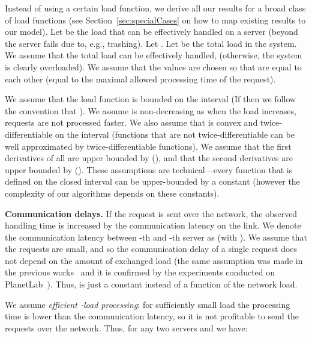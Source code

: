 \documentclass[11pt]{article}
\begin{document}
Instead of using a certain load function, we derive all our results for a broad class of load functions (see Section~\ref{sec:specialCases} on how to map existing results to our model). 
Let  be the load that can be effectively handled on a server  (beyond  the server fails due to, e.g., trashing). 
Let . 
Let  be the total load in the system. 
We assume that the total load can be effectively handled,  (otherwise, the system is clearly overloaded). We assume that the values  are chosen so that  are equal to each other (equal to the maximal allowed processing time of the request). 

We assume that the load function  is bounded on the interval  (If  then we follow the convention that ). We assume  is non-decreasing as when the load increases, requests are not processed faster.
We also assume that  is convex and twice-differentiable on the interval  (functions that are not twice-differentiable can be well approximated by twice-differentiable functions). 
We assume that the first derivatives  of all  are upper bounded by  (), 
and that the second derivatives  are upper bounded by  ().
These assumptions are technical---every function that is defined on the closed interval can be upper-bounded by a constant (however the complexity of our algorithms depends on these constants).







\medskip

\noindent
\textbf{Communication delays.}\quad
If the request is sent over the network, the observed handling time is increased by the communication latency on the link.
We denote the communication latency between -th and -th server as  (with ). 
We assume that the requests are small, and so the communication delay of a single request does not depend on the amount of exchanged load (the same assumption was made in the previous works~\cite{Penmatsa:2006:CLB:1898953.1899089, Liu:2011:GGL:1993744.1993767, Skowron:2013:NDL:2510648.2510769, Grosu:2008:CLB:1455689.1455695, gallet09divisibleload, beaumont2005scheduling, veeravalli2002efficient, drozdowski2008scheduling} and it is confirmed by the experiments conducted on PlanetLab~\cite{Skowron:2013:NDL:2510648.2510769}). Thus,  is just a constant instead of a function of the network load.

We assume \emph{efficient -load processing}: for sufficiently small load  the processing time is lower than the communication latency, 
so it is not profitable to send the requests over the network. 
Thus, for any two servers  and  we have:
\end{document}
